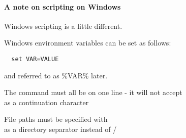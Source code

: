 \paragraph{A note on scripting on Windows}
Windows scripting is a little different.
\begin{description}
  \item Windows environment variables can be set as follows:
  \begin{verbatim}
  set VAR=VALUE
  \end{verbatim}
  and referred to as \%VAR\% later.
  \item The \map{} command must all be on one line - it will not accept \\ as a continuation character
  \item File paths must be specified with \\ as a directory separator instead of /
\end{description}





